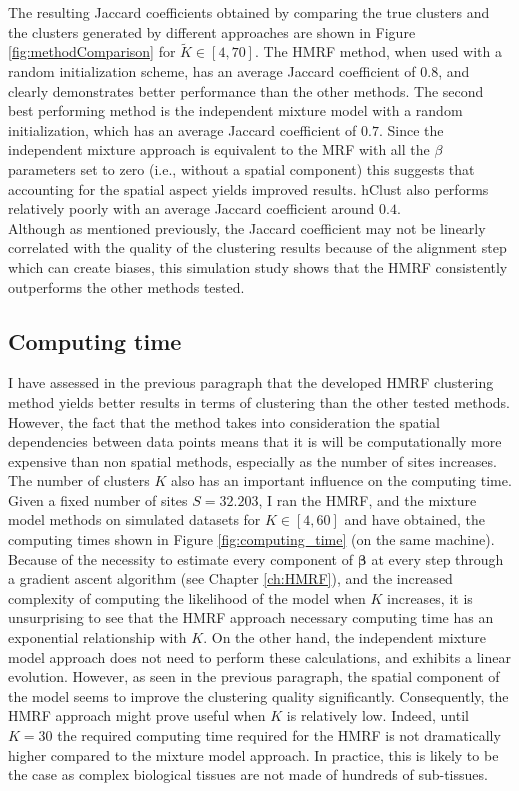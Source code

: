 	The resulting Jaccard coefficients obtained by comparing the true clusters and the clusters generated by different approaches are shown in Figure \ref{fig:methodComparison} for $\tilde{K} \in [4,70]$. The HMRF method, when used with a random initialization scheme, has an average Jaccard coefficient of $0.8$, and clearly demonstrates better performance than the other methods. The second best performing method is the independent mixture model with a random initialization, which has an average Jaccard coefficient of $0.7$. Since the independent mixture approach is equivalent to the MRF with all the $\beta$ parameters set to zero (i.e., without a spatial component) this suggests that accounting for the spatial aspect yields improved results. hClust also performs relatively poorly with an average Jaccard coefficient around $0.4$.\\
	
	Although as mentioned previously, the Jaccard coefficient may not be linearly correlated with the quality of the clustering results because of the alignment step which can create biases, this simulation study shows that the HMRF consistently outperforms the other methods tested.
	
	
	\subsection{Computing time}
	I have assessed in the previous paragraph that the developed HMRF clustering method yields better results in terms of clustering than the other tested methods. However, the fact that the method takes into consideration the spatial dependencies between data points means that it is will be computationally more expensive than non spatial methods, especially as the number of sites increases.\\
	
	The number of clusters $K$ also has an important influence on the computing time. Given a fixed number of sites $S=32.203$, I ran the HMRF, and the mixture model methods on simulated datasets for $K \in [4,60]$ and have obtained, the computing times shown in Figure \ref{fig:computing_time} (on the same machine).\\
	
	Because of the necessity to estimate every component of $\boldsymbol{\beta}$ at every step through a gradient ascent algorithm (see Chapter \ref{ch:HMRF}), and the increased complexity of computing the likelihood of the model when $K$ increases, it is unsurprising to see that the HMRF approach necessary computing time has an exponential relationship with $K$. On the other hand, the independent mixture model approach does not need to perform these calculations, and exhibits a linear evolution. However, as seen in the previous paragraph, the spatial component of the model seems to improve the clustering quality significantly. Consequently, the HMRF approach might prove useful when $K$ is relatively low. Indeed, until $K=30$ the required computing time required for the HMRF is not dramatically higher compared to the mixture model approach. In practice, this is likely to be the case as complex biological tissues are not made of hundreds of sub-tissues. \\
	
